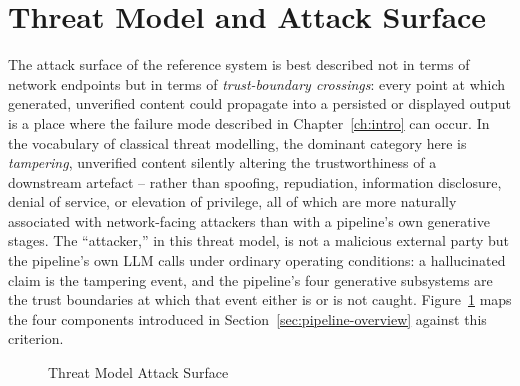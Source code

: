 \documentclass[12pt,a4paper]{report}
\begin{document}
\section{Threat Model and Attack Surface}
\label{sec:threat-model}
The attack surface of the reference system is best described not in terms of
network endpoints but in terms of \emph{trust-boundary crossings}: every point
at which generated, unverified content could propagate into a persisted or
displayed output is a place where the failure mode described in
Chapter~\ref{ch:intro} can occur. In the vocabulary of classical threat
modelling, the dominant category here is \emph{tampering}, unverified
content silently altering the trustworthiness of a downstream artefact --
rather than spoofing, repudiation, information disclosure, denial of service,
or elevation of privilege, all of which are more naturally associated with
network-facing attackers than with a pipeline's own generative stages. The
``attacker,'' in this threat model, is not a malicious external party but the
pipeline's own LLM calls under ordinary operating conditions: a hallucinated
claim is the tampering event, and the pipeline's four generative
subsystems are the trust boundaries at which that event either is or is not
caught. Figure~\ref{fig:threat} maps the four
components introduced in Section~\ref{sec:pipeline-overview} against this
criterion.

\begin{figure}[H]
\centering
{}
\caption{Threat Model Attack Surface}
\label{fig:threat}
\end{figure}
\end{document}
